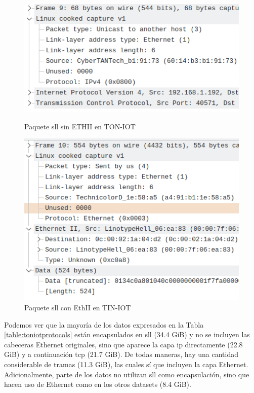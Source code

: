 \begin{figure}[H]
  \includegraphics[width=\linewidth]{media/toniot_pcap_ssl_ip_packet.png}
  \captionsetup{justification=centering}
  \caption{Paquete \acrshort{sll} sin ETHII en TON-IOT}\label{fig:toniot_pcap_ssl_ip_packet}
  \endminipage\hfill
    \includegraphics[width=\linewidth]{media/toniot_pcap_ssl_eth_packet.png}
    \captionsetup{justification=centering}
    \caption{Paquete \acrshort{sll} con EthII en TIN-IOT}\label{fig:toniot_pcap_ssl_eth_packet}
  \endminipage\hfill
\end{figure}

Podemos ver que la mayoría de los datos expresados en la Tabla \ref{table:toniotprotocols} están encapsulados en \acrshort{sll} (34.4 GiB) y no se incluyen las cabeceras Ethernet originales, sino que aparece la capa \acrshort{ip} directamente (22.8 GiB) y a continuación \acrshort{tcp} (21.7 GiB). De todas maneras, hay una cantidad considerable de tramas (11.3 GiB), las cuales sí que incluyen la capa Ethernet. Adicionalmente, parte de los datos no utilizan \acrshort{sll} como encapsulación, sino que hacen uso de Ethernet como en los otros datasets (8.4 GiB). 


